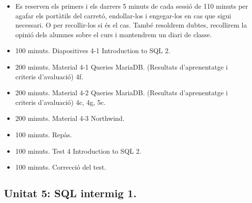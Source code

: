 \documentclass[catalan, a4paper, 12pt, titlepage]{article}
\begin{document}
  \begin{itemize}
          \item Es reserven els primers i els darrers 5 minuts de cada sessió de 110 minuts per agafar els portàtils del carretó, endollar-los i engegar-los en cas que sigui necessari. O per recollir-los si és el cas. També resoldrem dubtes, recollirem la opinió dels alumnes sobre el curs i mantendrem un diari de classe.
	  \item 100 minuts. Diapositives 4-1 Introduction to SQL 2.
	  \item 200 minuts. Material 4-1 Queries MariaDB. (\faGraduationCap Resultats d'aprenentatge i criteris d'avaluació) 4f.
	  \item 200 minuts. Material 4-2 Queries MariaDB. (\faGraduationCap Resultats d'aprenentatge i criteris d'avaluació) 4c, 4g, 5c.
	  \item 200 minuts. Material 4-3 Northwind.
	  \item 100 minuts. Repàs.
	  \item 100 minuts. Test 4 Introduction to SQL 2.
	  \item 100 minuts. Correcció del test.
  \end{itemize}

  \subsection{Unitat 5: SQL intermig 1.}
  
\end{document}

